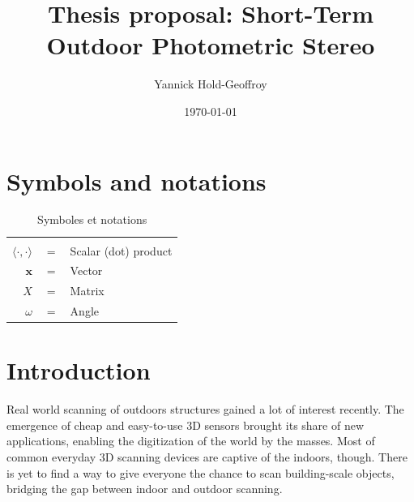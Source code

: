 \documentclass{report}
\title{Thesis proposal: Short-Term Outdoor Photometric Stereo}
\author{Yannick Hold-Geoffroy}
\date{\today}
\begin{document}

\maketitle

\tableofcontents

\newcommand{\boldomega}{\boldsymbol \omega} %
\newcommand{\boldmu}{\boldsymbol \mu} %
\newcommand{\bolddelta}{\boldsymbol \delta} %

\graphicspath{{figures/}}


\chapter*{Symbols and notations}

\begin{table}[htbp]\caption{Symboles et notations}
\centering %
\begin{tabular}{r c p{10cm} }

\hline & & \\
$\langle \cdot, \cdot \rangle$      & $=$ & Scalar (dot) product \\
$\mathbf{x}$                        & $=$ & Vector \\
$X$                                 & $=$ & Matrix \\
$\omega$                            & $=$ & Angle \\
\hline
\end{tabular}
\label{tab:TableOfNotationForMyResearch}
\end{table}


\chapter{Introduction}

Real world scanning of outdoors structures gained a lot of interest recently. The emergence of cheap and easy-to-use 3D sensors brought its share of new applications, enabling the digitization of the world by the masses. Most of common everyday 3D scanning devices are captive of the indoors, though. There is yet to find a way to give everyone the chance to scan building-scale objects, bridging the gap between indoor and outdoor scanning.
\end{document}
